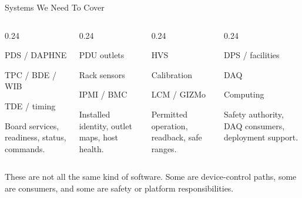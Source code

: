 \documentclass[aspectratio=169,10pt]{beamer}
\begin{document}
\begin{frame}{Systems We Need To Cover}
\begin{columns}[T,onlytextwidth]
  \begin{column}{0.24\textwidth}
      {PDS / DAPHNE\par TPC / BDE / WIB\par TDE / timing}
      {Board services, readiness, status, commands.}
  \end{column}
  \begin{column}{0.24\textwidth}
      {PDU outlets\par Rack sensors\par IPMI / BMC}
      {Installed identity, outlet maps, host health.}
  \end{column}
  \begin{column}{0.24\textwidth}
      {HVS\par Calibration\par LCM / GIZMo}
      {Permitted operation, readback, safe ranges.}
  \end{column}
  \begin{column}{0.24\textwidth}
      {DPS / facilities\par DAQ\par Computing}
      {Safety authority, DAQ consumers, deployment support.}
  \end{column}
\end{columns}
\medskip
{}
  {These are not all the same kind of software. Some are device-control paths, some are consumers, and some are safety or platform responsibilities.}
  {}
\end{frame}
\end{document}
